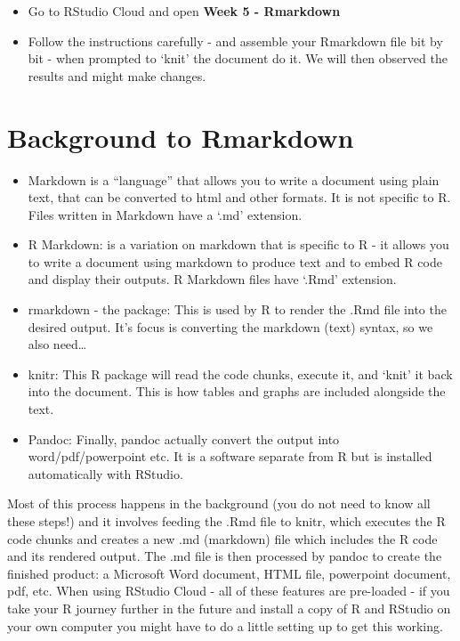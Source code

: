 \documentclass[
]{book}
\begin{document}
\begin{itemize}
\item
  Go to RStudio Cloud and open \textbf{Week 5 - Rmarkdown}
\item
  Follow the instructions carefully - and assemble your Rmarkdown file bit by bit - when prompted to `knit' the document do it. We will then observed the results and might make changes.
\end{itemize}

\hypertarget{background-to-rmarkdown}{%
\section{Background to Rmarkdown}\label{background-to-rmarkdown}}

\begin{itemize}
\item
  Markdown is a ``language'' that allows you to write a document using plain text, that can be converted to html and other formats. It is not specific to R. Files written in Markdown have a `.md' extension.
\item
  R Markdown: is a variation on markdown that is specific to R - it allows you to write a document using markdown to produce text and to embed R code and display their outputs. R Markdown files have `.Rmd' extension.
\item
  rmarkdown - the package: This is used by R to render the .Rmd file into the desired output. It's focus is converting the markdown (text) syntax, so we also need\ldots{}
\item
  knitr: This R package will read the code chunks, execute it, and `knit' it back into the document. This is how tables and graphs are included alongside the text.
\item
  Pandoc: Finally, pandoc actually convert the output into word/pdf/powerpoint etc. It is a software separate from R but is installed automatically with RStudio.
\end{itemize}

Most of this process happens in the background (you do not need to know all these steps!) and it involves feeding the .Rmd file to knitr, which executes the R code chunks and creates a new .md (markdown) file which includes the R code and its rendered output. The .md file is then processed by pandoc to create the finished product: a Microsoft Word document, HTML file, powerpoint document, pdf, etc.
When using RStudio Cloud - all of these features are pre-loaded - if you take your R journey further in the future and install a copy of R and RStudio on your own computer you might have to do a little setting up to get this working.
\end{document}
